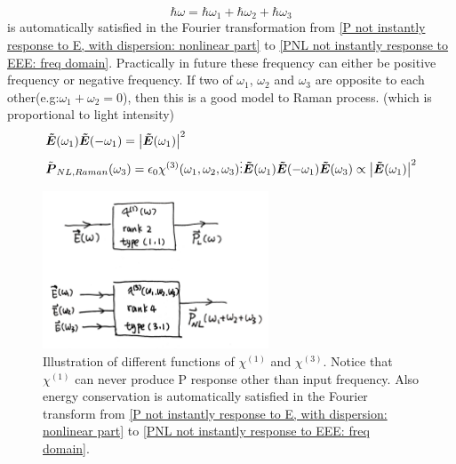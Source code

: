 \documentclass[12pt]{extarticle}
\numberwithin{equation}{section}
\numberwithin{figure}{section}
\numberwithin{table}{section}
\newcommand{\<}{\langle}
\renewcommand{\>}{\rangle}
\theoremstyle{definition}
\begin{document}
\begin{itemize}
                \begin{equation}
                    \hbar \omega = \hbar \omega_1 +\hbar \omega_2+\hbar \omega_3
                    \label{photonic energy conservation: four wave expression}
                \end{equation}
                is automatically satisfied in the Fourier transformation from \autoref{P not instantly response to E, with dispersion: nonlinear part} to \autoref{PNL not instantly response to EEE: freq domain}. Practically in future these frequency can either be positive frequency or negative frequency. If two of $\omega_1$, $\omega_2$ and $\omega_3$ are opposite to each other(e.g:$\omega_1+\omega_2=0$), then this is a good model to Raman process. (which is proportional to light intensity)
                \begin{subequations}
                \begin{align}
                    &\boldsymbol{\Tilde{E}}(\omega_1)\boldsymbol{\Tilde{E}}(-\omega_1)=\abs{\boldsymbol{\Tilde{E}}(\omega_1)}^2\\
                    &\Tilde{\boldsymbol{P}}_{NL,Raman}(\omega_3)=\epsilon_0 \chi^{(3)}(\omega_1,\omega_2,\omega_3)\vdots \boldsymbol{\Tilde{E}}(\omega_1)\boldsymbol{\Tilde{E}}(-\omega_1)\boldsymbol{\Tilde{E}}(\omega_3) \propto \abs{\boldsymbol{\Tilde{E}}(\omega_1)}^2
                \end{align}
                    
                \end{subequations}
                
                \begin{figure}[htbp]
                    \centering
                    \includegraphics[width=0.6\textwidth]{images/chi1_and_chi3_in_freq_domian.jpg}
                    \caption{Illustration of different functions of $\chi^{(1)}$ and $\chi^{(3)}$. Notice that $\chi^{(1)}$ can never produce P response other than input frequency. Also energy conservation is automatically satisfied in the Fourier transform from \autoref{P not instantly response to E, with dispersion: nonlinear part} to \autoref{PNL not instantly response to EEE: freq domain}.}
                    \label{fig: chi1 and chi3 freq domain illustration}
                \end{figure}
                

\end{itemize}
\end{document}
